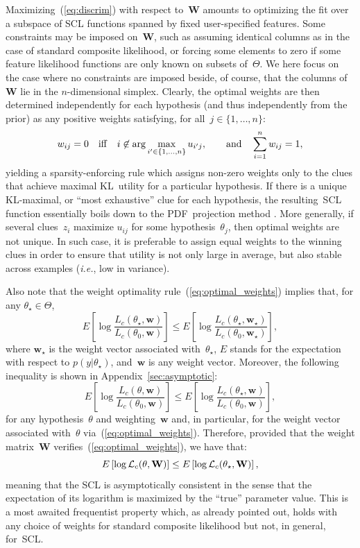 \documentclass[english]{scrartcl}
\begin{document}
Maximizing~(\ref{eq:discrim}) with respect to~$\mathbf{W}$ amounts to optimizing the fit over a subspace of SCL functions spanned by fixed user-specified features. Some constraints may be imposed on~$\mathbf{W}$, such as assuming identical columns as in the case of standard composite likelihood, or forcing some elements to zero if some feature likelihood functions are only known on subsets of~$\Theta$. We here focus on the case where no constraints are imposed beside, of course, that the columns of~$\mathbf{W}$ lie in the $n$-dimensional simplex. Clearly, the optimal weights are then determined independently for each hypothesis (and thus independently from the prior) as any positive weights satisfying, for all~$j\in\{1,\ldots,n\}$:
\begin{equation}
\label{eq:optimal_weights}
w_{ij} = 0 
\quad {\rm iff}\quad  
i \not\in \arg\max_{i'\in\{1,\ldots,n\}} u_{i'j},
\qquad {\rm and} \quad
\sum_{i=1}^n w_{ij}=1
,
\end{equation}
yielding a sparsity-enforcing rule which assigns non-zero weights only to the clues that achieve maximal KL~utility for a particular hypothesis. If there is a unique KL-maximal, or ``most exhaustive'' clue for each hypothesis, the resulting~SCL function essentially boils down to the PDF~projection method \cite{Baggenstoss-03,Minka-04,Baggenstoss-15}. More generally, if several clues~$z_i$ maximize $u_{ij}$ for some hypothesis~$\theta_j$, then optimal weights are not unique. In such case, it is preferable to assign equal weights to the winning clues in order to ensure that utility is not only large in average, but also stable across examples ({\em i.e.}, low in variance). 

Also note that the weight optimality rule~(\ref{eq:optimal_weights}) implies that, for any $\theta_\star \in \Theta$,
$$
E\left[ \log \frac{L_c(\theta_\star, \mathbf{w})}{L_c(\theta_0, \mathbf{w})} \right]
\leq
E\left[ \log \frac{L_c(\theta_\star, \mathbf{w}_\star)}{L_c(\theta_0, \mathbf{w}_\star)} \right],
$$
where $\mathbf{w}_\star$ is the weight vector associated with~$\theta_\star$, $E$ stands for the expectation with respect to $p(y|\theta_\star)$, and~$\mathbf{w}$ is any weight vector. Moreover, the following inequality is shown in Appendix~\ref{sec:asymptotic}:
$$
E\left[ \log \frac{L_c(\theta, \mathbf{w})}{L_c(\theta_0, \mathbf{w})} \right]
\leq
E\left[ \log \frac{L_c(\theta_\star, \mathbf{w})}{L_c(\theta_0, \mathbf{w})} \right]
,
$$
for any hypothesis~$\theta$ and weighting~$\mathbf{w}$ and, in particular, for the weight vector associated with~$\theta$ via~(\ref{eq:optimal_weights}). Therefore, provided that the weight matrix~$\mathbf{W}$ verifies~(\ref{eq:optimal_weights}), we have that:
$$
E \left[\log {\cal L}_c(\theta,\mathbf{W}) \right]
\leq 
E \left[\log {\cal L}_c(\theta_\star,\mathbf{W}) \right]
,
$$
meaning that the SCL is asymptotically consistent in the sense that the expectation of its logarithm is maximized by the ``true'' parameter value. This is a most awaited frequentist property which, as already pointed out, holds with any choice of weights for standard composite likelihood but not, in general, for~SCL.
\end{document}
